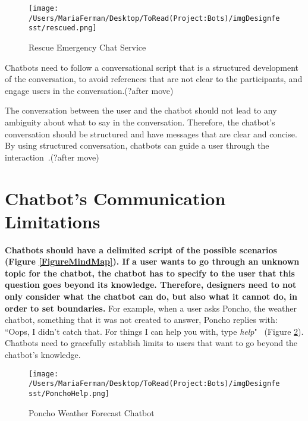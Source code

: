 \documentclass[a4paper,10pt]{article}
\begin{document}
\begin{figure}
\centering
\texttt{[image: /Users/MariaFerman/Desktop/ToRead(Project:Bots)/imgDesignfesst/rescued.png]}
\caption{Rescue Emergency Chat Service}
\label{FigureRescue}
\end{figure}

Chatbots need to follow a conversational script that is a structured development of the conversation, to avoid references that are not clear to the participants, and engage users in the conversation.(?after move)

The conversation between the user and the chatbot should not lead to any ambiguity about what to say in the conversation. Therefore, the chatbot's conversation should be structured and have messages that are clear and concise. By using structured conversation, chatbots can guide a user through the interaction~\cite{HeuristicsWebPage}.(?after move)


\section{Chatbot's Communication Limitations}

\textbf{Chatbots should have a delimited script of the possible scenarios (Figure \ref{FigureMindMap}). If a user wants to go through an unknown topic for the chatbot, the chatbot has to specify to the user that this question goes beyond its knowledge. Therefore, designers need to not only consider what the chatbot can do, but also what it cannot do, in order to set boundaries.} For example, when a user asks Poncho, the weather chatbot, something that it was not created to answer, Poncho replies with: ``Oops, I didn't catch that. For things I can help you with, type \textit{help}"~\cite{HeuristicsWebPage} (Figure \ref{FigureCommunicationCapabilities}). Chatbots need to gracefully establish limits to users that want to go beyond the chatbot's knowledge.  

\begin{figure}
\centering
\texttt{[image: /Users/MariaFerman/Desktop/ToRead(Project:Bots)/imgDesignfesst/PonchoHelp.png]}
\caption{Poncho Weather Forecast Chatbot}
\label{FigureCommunicationCapabilities}
\end{figure}
\end{document}
